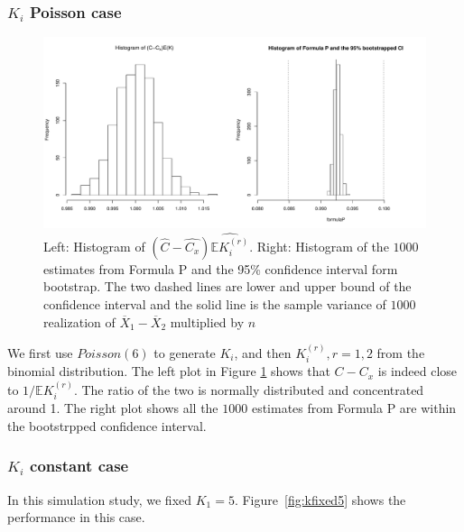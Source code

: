 \documentclass[10pt]{article}
\newcommand{\wht}{\widehat}
\newcommand{\bbe}{\mathbb{E}}
\newcommand{\xbar}{\overline{X}}
\begin{document}
\subsubsection{$K_i$ Poisson case}
\begin{figure}[!hbtp]
  \centering
  \includegraphics[width=\textwidth]{kpois6}
  \caption{Left: Histogram of $(\wht{C}-\wht{C_x})\wht{\bbe K_i^{(r)}}$. Right: Histogram of the $1000$ estimates from Formula P and the 95\% confidence interval form bootstrap. The two dashed lines are lower and upper bound of the confidence interval and the solid line is the sample variance of $1000$ realization of $\xbar_1-\xbar_2$ multiplied by $n$}
  \label{fig:kpois6}
\end{figure}
We first use $Poisson(6)$ to generate $K_i$, and then $K_i^{(r)},r=1,2$ from the binomial distribution. The left plot in Figure \ref{fig:kpois6} shows that $C-C_x$ is indeed close to $1/\bbe K_i^{(r)}$. The ratio of the two is normally distributed and concentrated around 1. The right plot shows all the $1000$ estimates from Formula P are within the bootstrpped confidence interval. 

\subsubsection{$K_i$ constant case}
In this simulation study, we fixed $K_1=5$. Figure~\ref{fig:kfixed5} shows the performance in this case.
\end{document}
